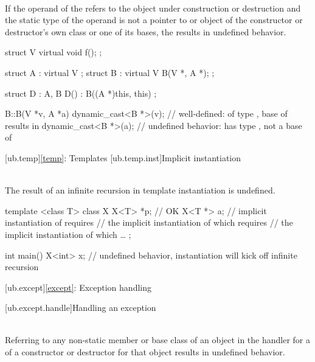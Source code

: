{\pnum
{} \\
If the operand of the
 refers to the object under construction or destruction and the static type of the operand is
not a pointer to or object of the constructor or destructor's own class or one of its bases, the 
results in undefined behavior.

\pnum
\begin{example}
\begin{codeblock}
struct V {
  virtual void f();
};

struct A : virtual V {};
struct B : virtual V {
  B(V *, A *);
};

struct D : A, B {
  D() : B((A *)this, this) {}
};

B::B(V *v, A *a) {
  dynamic_cast<B *>(v); // well-defined:  of type ,  base of  results in 
  dynamic_cast<B *>(a); // undefined behavior:  has type ,  not a base of 
}
\end{codeblock}
\end{example}


[ub.temp]{\ref{temp}: Templates}
[ub.temp.inst]{Implicit instantiation}

\pnum
{} \\
The result of an infinite recursion in template instantiation is undefined.

\pnum
\begin{example}
\begin{codeblock}
template <class T>
class X {
  X<T> *p;      // OK
  X<T *> a;     // implicit instantiation of  requires
                // the implicit instantiation of  which requires
                // the implicit instantiation of  which \ldots
};

int main() {
  X<int> x;     // undefined behavior, instantiation will kick off infinite recursion
}
\end{codeblock}
\end{example}


[ub.except]{\ref{except}: Exception handling}

[ub.except.handle]{Handling an exception}

\pnum
{} \\
Referring to any non-static member or base class of an object in the handler for a   of a
constructor or destructor for that object results in undefined behavior.

}
